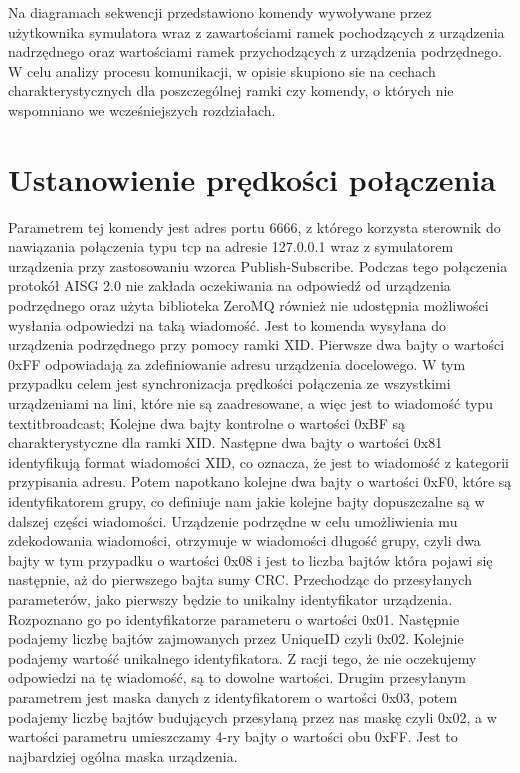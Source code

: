     Na diagramach sekwencji przedstawiono komendy wywoływane przez użytkownika
    symulatora wraz z zawartościami ramek pochodzących z urządzenia nadrzędnego oraz
    wartościami ramek przychodzących z urządzenia podrzędnego.
    W celu analizy procesu komunikacji, w opisie skupiono sie na cechach charakterystycznych
    dla poszczególnej ramki czy komendy, o których nie wspomniano we wcześniejszych rozdziałach.
    
    \section{Ustanowienie prędkości połączenia}
    Parametrem tej komendy jest adres portu 6666, z którego korzysta sterownik
    do nawiązania połączenia typu tcp na adresie 127.0.0.1 wraz z symulatorem urządzenia
    przy zastosowaniu wzorca Publish-Subscribe. Podczas tego połączenia protokół AISG 2.0 
    nie zakłada oczekiwania na odpowiedź od urządzenia podrzędnego oraz użyta biblioteka
    ZeroMQ również nie udostępnia możliwości wysłania odpowiedzi na taką wiadomość.
    \newline\newline
	Jest to komenda wysyłana do urządzenia podrzędnego przy pomocy ramki XID.
	\newline
	Pierwsze dwa bajty o wartości 0xFF odpowiadają za zdefiniowanie adresu urządzenia docelowego. 
	W tym przypadku celem jest synchronizacja prędkości połączenia ze wszystkimi urządzeniami na lini, które nie są zaadresowane, a więc jest to wiadomość typu textit{broadcast};
	\newline
	Kolejne dwa bajty kontrolne o wartości 0xBF są charakterystyczne dla ramki XID.
	\newline
	Następne dwa bajty o wartości 0x81 identyfikują format wiadomości XID, co oznacza, że jest to wiadomość z kategorii przypisania adresu.
	\newline
	Potem napotkano kolejne dwa bajty o wartości 0xF0, które są identyfikatorem grupy, co definiuje nam jakie kolejne bajty dopuszczalne są w dalszej części wiadomości.
	\newline
	Urządzenie podrzędne w celu umożliwienia mu zdekodowania wiadomości, otrzymuje w wiadomości długość grupy, czyli dwa bajty w tym przypadku o wartości 0x08 i jest to 
	liczba bajtów która pojawi się następnie, aż do pierwszego bajta sumy CRC.
	\newline
	Przechodząc do przesyłanych parameterów, jako pierwszy będzie to unikalny identyfikator urządzenia. Rozpoznano go po identyfikatorze parameteru o wartości 0x01.
	Następnie podajemy liczbę bajtów zajmowanych przez UniqueID czyli 0x02. Kolejnie podajemy wartość unikalnego identyfikatora. Z racji tego, że nie oczekujemy odpowiedzi
	na tę wiadomość, są to dowolne wartości.
	Drugim przesyłanym parametrem jest maska danych z identyfikatorem o wartości 0x03, potem podajemy liczbę bajtów budujących przesyłaną przez nas maskę czyli 0x02, a w wartości 
	parametru umieszczamy 4-ry bajty o wartości obu 0xFF. Jest to najbardziej ogólna maska urządzenia.


